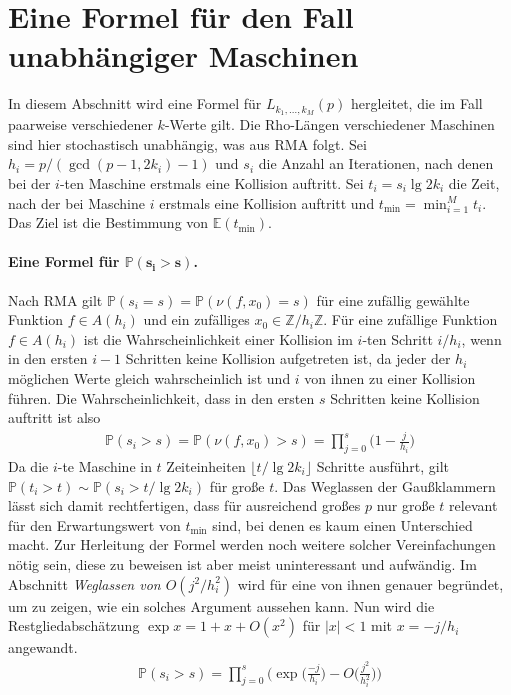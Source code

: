\documentclass[a4paper, 10pt, ngerman]{article}
\newcommand{\E}{\mathbb{E}}
\newcommand{\Z}{\mathbb{Z}}
\renewcommand{\P}{\mathbb{P}}
\begin{document}
\section{Eine Formel für den Fall unabhängiger Maschinen}

In diesem Abschnitt wird eine Formel für $L_{k_1, \dots, k_M}(p)$ hergleitet, die im Fall paarweise verschiedener $k$-Werte gilt. Die Rho-Längen verschiedener Maschinen sind hier stochastisch unabhängig, was aus RMA folgt. Sei $h_i = p/(\gcd(p - 1, 2k_i) - 1)$ und $s_i$ die Anzahl an Iterationen, nach denen bei der $i$-ten Maschine erstmals eine Kollision auftritt. Sei $t_i = s_i \lg 2k_i$ die Zeit, nach der bei Maschine $i$ erstmals eine Kollision auftritt und $t_{\min} = \min_{i = 1}^M t_i$. Das Ziel ist die Bestimmung von $\E(t_{\min})$.

\paragraph{Eine Formel für $\pmb{\P(s_i > s)}$.} Nach RMA gilt $\P(s_i = s) = \P(\nu(f, x_0) = s)$ für eine zufällig gewählte Funktion $f \in A(h_i)$ und ein zufälliges $x_0 \in \Z/h_i\Z$. Für eine zufällige Funktion $f \in A(h_i)$ ist die Wahrscheinlichkeit einer Kollision im $i$-ten Schritt $i/h_i$, wenn in den ersten $i-1$ Schritten keine Kollision aufgetreten ist, da jeder der $h_i$ möglichen Werte gleich wahrscheinlich ist und $i$ von ihnen zu einer Kollision führen. Die Wahrscheinlichkeit, dass in den ersten $s$ Schritten keine Kollision auftritt ist also
\begin{align*}
    \P(s_i > s)
    = \P(\nu(f, x_0) > s)
    = \prod_{j = 0}^s \bigg (1 - \frac {j} {h_i} \bigg )
\end{align*}
Da die $i$-te Maschine in $t$ Zeiteinheiten $\lfloor t / \lg 2k_i \rfloor$ Schritte ausführt, gilt $\P(t_i > t) \sim \P(s_i > t / \lg 2k_i)$ für große $t$. Das Weglassen der Gaußklammern lässt sich damit rechtfertigen, dass für ausreichend großes $p$ nur große $t$ relevant für den Erwartungswert von $t_{\min}$ sind, bei denen es kaum einen Unterschied macht. Zur Herleitung der Formel werden noch weitere solcher Vereinfachungen nötig sein, diese zu beweisen ist aber meist uninteressant und aufwändig. Im Abschnitt \emph{Weglassen von $O(j^2/h_i^2)$} wird für eine von ihnen genauer begründet, um zu zeigen, wie ein solches Argument aussehen kann. Nun wird die Restgliedabschätzung $\exp x = 1 + x + O(x^2)$ für $|x| < 1$ mit $x = -j/h_i$ angewandt.
\begin{align*}
    \P(s_i > s)
    = \prod_{j = 0}^{s} \Bigg ( \exp \bigg ( \frac {-j}{h_i} \bigg )
    - O \bigg ( \frac {j^2} {h_i^2} \bigg ) \Bigg )
\end{align*}
\end{document}

